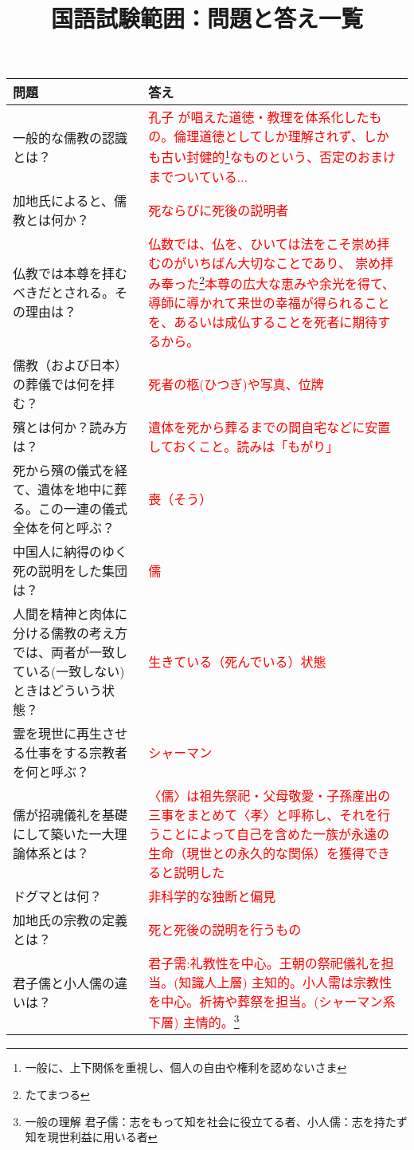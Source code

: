 \documentclass[a4paper,10pt]{article}
\title{国語試験範囲：問題と答え一覧}
\date{}
\begin{document}
\maketitle
\vspace{-2cm}
\begin{longtable}{|p{}|p{}|}
\hline
\textbf{問題} & \textbf{答え} \\ \hline
一般的な儒教の認識とは？ & \textcolor{red}{孔子 が唱えた道徳・教理を体系化したもの。倫理道徳としてしか理解されず、しかも古い封健的\footnote{一般に、上下関係を重視し、個人の自由や権利を認めないさま}なものという、否定のおまけまでついている...} \\ \hline
加地氏によると、儒教とは何か？ & \textcolor{red}{死ならびに死後の説明者} \\ \hline
仏教では本尊を拝むべきだとされる。その理由は？ & \textcolor{red}{仏数では、仏を、ひいては法をこそ崇め拝むのがいちばん大切なことであり、
崇め拝み奉った\footnote{たてまつる}本尊の広大な恵みや余光を得て、導師に導かれて来世の幸福が得られることを、あるいは成仏することを死者に期待するから。} \\ \hline
儒教（および日本）の葬儀では何を拝む？ & \textcolor{red}{死者の柩(ひつぎ)や写真、位牌} \\ \hline
殯とは何か？読み方は？ & \textcolor{red}{遺体を死から葬るまでの間自宅などに安置しておくこと。読みは「もがり」} \\ \hline
死から殯の儀式を経て、遺体を地中に葬る。この一連の儀式全体を何と呼ぶ？ & \textcolor{red}{喪（そう）} \\ \hline
中国人に納得のゆく死の説明をした集団は？ & \textcolor{red}{儒} \\ \hline
人間を精神と肉体に分ける儒教の考え方では、両者が一致している(一致しない)ときはどういう状態？ & \textcolor{red}{生きている（死んでいる）状態} \\ \hline
霊を現世に再生させる仕事をする宗教者を何と呼ぶ？ & \textcolor{red}{シャーマン} \\ \hline
儒が招魂儀礼を基礎にして築いた一大理論体系とは？ & \textcolor{red}{〈儒〉は祖先祭祀・父母敬愛・子孫産出の三事をまとめて〈孝〉と呼称し、それを行うことによって自己を含めた一族が永遠の生命（現世との永久的な関係）を獲得できると説明した} \\ \hline
ドグマとは何？ & \textcolor{red}{非科学的な独断と偏見} \\ \hline
加地氏の宗教の定義とは？ & \textcolor{red}{死と死後の説明を行うもの} \\ \hline
君子儒と小人儒の違いは？ & \textcolor{red}{君子需:礼教性を中心。王朝の祭祀儀礼を担当。(知識人上層) 主知的。小人需は宗教性を中心。祈祷や葬祭を担当。(シャーマン系下層) 主情的。\footnote{一般の理解 君子儒：志をもって知を社会に役立てる者、小人儒：志を持たず知を現世利益に用いる者}} \\ \hline

\end{longtable}
\end{document}
